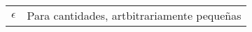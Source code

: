 \begin{table}[ht!]
\begin{center}
\begin{tabularx}{\textwidth}{|r|X|}
            $ \epsilon $                                                      & Para cantidades, artbitrariamente pequeñas                                                                                 \\


\end{tabularx}
\end{center}
\end{table}
